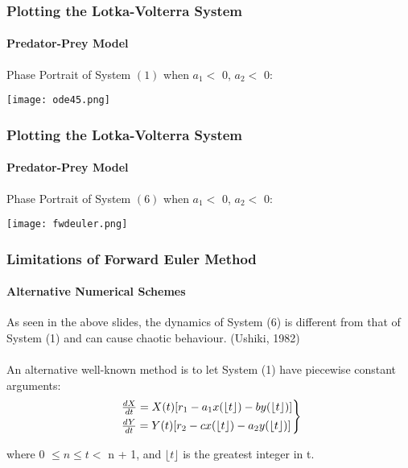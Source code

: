 \documentclass[xcolor={svgnames},hyperref={colorlinks,allcolors=Blue}]{beamer}
\begin{document}
\begin{frame}
\frametitle{Plotting the Lotka-Volterra System}
\framesubtitle{Predator-Prey Model}
Phase Portrait of System $(1)$ when $a_1 <$ 0, $a_2 <$ 0: 
	\begin{center}
		\texttt{[image: ode45.png]}
	\end{center}

\end{frame}

\begin{frame}
\frametitle{Plotting the Lotka-Volterra System}
\framesubtitle{Predator-Prey Model}
Phase Portrait of System $(6)$ when $a_1 <$ 0, $a_2 <$ 0: 
	\begin{center}
		\texttt{[image: fwdeuler.png]}
	\end{center}
\end{frame}

\begin{frame}
\frametitle{Limitations of Forward Euler Method}
\framesubtitle{Alternative Numerical Schemes}
As seen in the above slides, the dynamics of System (6) is different from that of System (1) and can cause chaotic behaviour. (Ushiki, 1982) \\~\\ 
\pause
An alternative well-known method is to let System (1) have piecewise constant arguments:
\begin{equation} 
	\begin{rcases}
		~\frac{dX}{dt} = X(t)[r_1-a_{1}x(\lfloor t \rfloor) - by(\lfloor t \rfloor)] \\
		~\frac{dY}{dt} = Y(t)[r_2-cx(\lfloor t \rfloor)-a_{2}y(\lfloor t \rfloor)] 
	\end{rcases}
\end{equation}

where 0 $\leqslant n \leqslant t <$ n + 1, and $\lfloor t \rfloor$ is the greatest integer in t. 

\end{frame}

%
\end{document}
